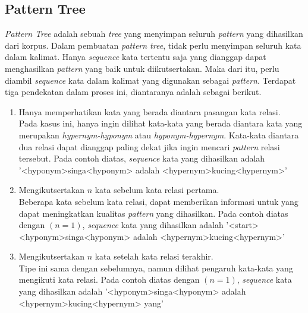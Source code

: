 \subsection{Pattern Tree}
\textit{Pattern Tree} adalah sebuah \textit{tree} yang menyimpan seluruh \textit{pattern} yang dihasilkan dari korpus. Dalam pembuatan \textit{pattern tree}, tidak perlu menyimpan seluruh kata dalam kalimat. Hanya \textit{sequence} kata tertentu saja yang dianggap dapat menghasilkan \textit{pattern} yang baik untuk diikutsertakan. Maka dari itu, perlu diambil \textit{sequence} kata dalam kalimat yang digunakan sebagai \textit{pattern}. Terdapat tiga pendekatan dalam proses ini, diantaranya adalah sebagai berikut.
\begin{enumerate}
  \item Hanya memperhatikan kata yang berada diantara pasangan kata relasi. \\
  Pada kasus ini, hanya ingin dilihat kata-kata yang berada diantara kata yang merupakan \textit{hypernym-hyponym} atau \textit{hyponym-hypernym}. Kata-kata diantara dua relasi dapat dianggap paling dekat jika ingin mencari \textit{pattern} relasi tersebut. Pada contoh diatas, \textit{sequence} kata yang dihasilkan adalah '<hyponym>singa<hyponym> adalah <hypernym>kucing<hypernym>'
  \item Mengikutsertakan $n$ kata sebelum kata relasi pertama. \\
  Beberapa kata sebelum kata relasi, dapat memberikan informasi untuk yang dapat meningkatkan kualitas \textit{pattern} yang dihasilkan. Pada contoh diatas dengan $(n=1)$, \textit{sequence} kata yang dihasilkan adalah '<start> <hyponym>singa<hyponym> adalah <hypernym>kucing<hypernym>'
  \item Mengikutsertakan $n$ kata setelah kata relasi terakhir. \\
  Tipe ini sama dengan sebelumnya, namun dilihat pengaruh kata-kata yang mengikuti kata relasi. Pada contoh diatas dengan $(n=1)$, \textit{sequence} kata yang dihasilkan adalah '<hyponym>singa<hyponym> adalah <hypernym>kucing<hypernym> yang'
\end{enumerate}

